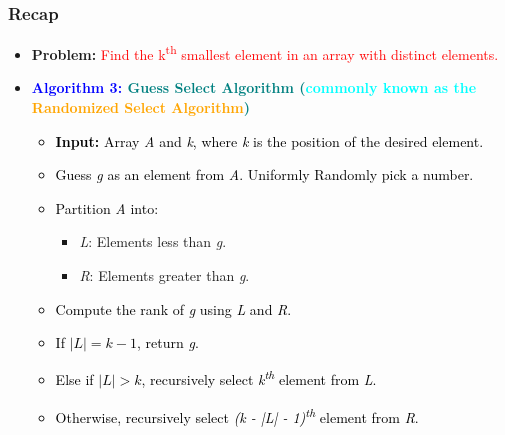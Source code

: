 \begin{frame}
    \frametitle{Recap}
    \vspace{0.3cm}
    \begin{itemize}
        \item \textbf{Problem:} \textcolor{red}{Find the k\textsuperscript{th} smallest element in an array with distinct elements.}
        \vspace{0.3cm} %
        \item \textcolor{blue}{\textbf{Algorithm 3: \textcolor{teal}{Guess Select Algorithm (}\textcolor{cyan}{commonly known as the} \textcolor{orange}{Randomized Select Algorithm}\textcolor{teal}{)}}}
        \vspace{0.2cm} %
        \begin{itemize}
            \item \textcolor{black}{\textbf{Input:} Array \textit{A} and \textit{k}, where \textit{k} is the position of the desired element.}
            \item \textcolor{black}{Guess \textit{g} as an element from \textit{A}. Uniformly Randomly pick a number.}
            \item \textcolor{black}{Partition \textit{A} into:}
            \begin{itemize}
                \item \textit{L}: Elements less than \textit{g}.
                \item \textit{R}: Elements greater than \textit{g}.
            \end{itemize}
            \item \textcolor{black}{Compute the rank of \textit{g} using \textit{L} and \textit{R}.}
            \item \textcolor{black}{If $|L| = k-1$, return \textit{g}.}
            \item \textcolor{black}{Else if $|L| > k$, recursively select \textit{k\textsuperscript{th}} element from \textit{L}.}
            \item \textcolor{black}{Otherwise, recursively select \textit{(k - |L| - 1)\textsuperscript{th}} element from \textit{R}.}
        \end{itemize}
    \end{itemize}
    \vspace{0.5cm} %
\end{frame}


